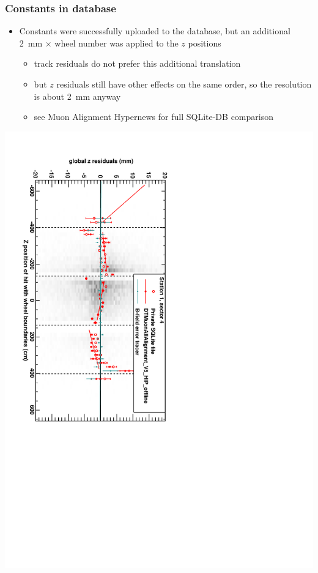 \documentclass[compress]{beamer}
\begin{document}
\begin{frame}
\frametitle{Constants in database}

\begin{itemize}
\item Constants were successfully uploaded to the database, but an
  additional 2~mm $\times$ wheel number was applied to the $z$
  positions
\begin{itemize}
\item track residuals do not prefer this additional translation
\item but $z$ residuals still have other effects on the same order, so
  the resolution is about 2~mm anyway
\item see Muon Alignment Hypernews for full SQLite-DB comparison
\end{itemize}
\end{itemize}

\vspace{-0.4 cm}
\begin{center}
\includegraphics[height=\linewidth, angle=90]{summary_DTzVsZ_st1_sr04.pdf}
\end{center}
\end{frame}
\end{document}
